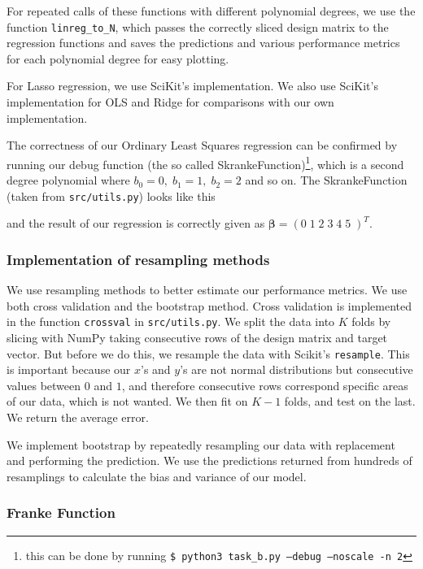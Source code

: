 \documentclass[twocolumn,10pt,cleanfoot]{asme2ej}
\begin{document}


For repeated calls of these functions with different polynomial degrees, we use the function \texttt{linreg\_to\_N}, which passes the correctly sliced design matrix to the regression functions and saves the predictions and various performance metrics for each polynomial degree for easy plotting.

For Lasso regression, we use SciKit's implementation. We also use SciKit's implementation for OLS and Ridge for comparisons with our own implementation.

The correctness of our Ordinary Least Squares regression can be confirmed by running our debug function (the so called SkrankeFunction)\footnote{this can be done by running \texttt{\$ python3 task\_b.py --debug --noscale -n 2}}, which is a second degree polynomial where $b_0 = 0, \; b_1 = 1, \; b_2 = 2$ and so on. The SkrankeFunction (taken from \texttt{src/utils.py}) looks like this



and the result of our regression is correctly given as $\bm{\beta} = (0 \; 1 \; 2 \; 3 \; 4 \; 5\;)^T$.

\subsubsection{Implementation of resampling methods}

We use resampling methods to better estimate our performance metrics. We use both cross validation and the bootstrap method. Cross validation is implemented in the function \texttt{crossval} in \texttt{src/utils.py}. We split the data into $K$ folds by slicing with NumPy taking consecutive rows of the design matrix and target vector. But before we do this, we resample the data with Scikit's \texttt{resample}. This is important because our $x$'s and $y$'s are not normal distributions but consecutive values between $0$ and $1$, and therefore consecutive rows correspond specific areas of our data, which is not wanted. We then fit on $K-1$ folds, and test on the last. We return the average error.

We implement bootstrap by repeatedly resampling our data with replacement and performing the prediction. We use the predictions returned from hundreds of resamplings to calculate the bias and variance of our model.

\subsubsection{Franke Function}
\end{document}
